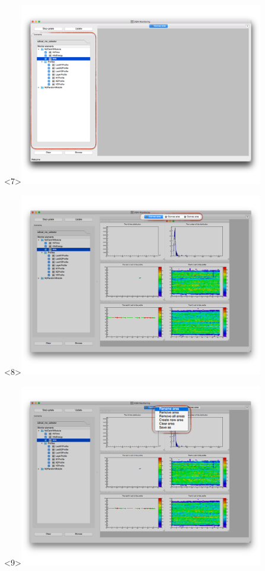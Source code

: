 \documentclass[8pt]{beamer}
\begin{document}
\begin{frame}
\begin{overlayarea}{\textwidth}{\textheight}
\begin{center}
         \begin{onlyenv}<7>\includegraphics[width=0.8\textwidth]{figs/MonitoringGui/MG_Content}\end{onlyenv}
         \begin{onlyenv}<8>\includegraphics[width=0.8\textwidth]{figs/MonitoringGui/MG_Tabs}\end{onlyenv}
         \begin{onlyenv}<9>\includegraphics[width=0.8\textwidth]{figs/MonitoringGui/MG_TabsMenu}\end{onlyenv}

\end{center}
\end{overlayarea}
\end{frame}
\end{document}
